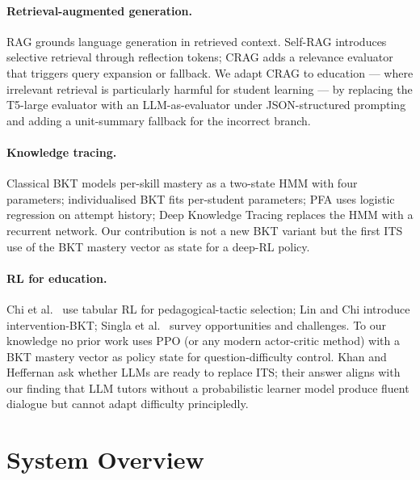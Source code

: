 \documentclass[conference]{IEEEtran}
\begin{document}
\paragraph{Retrieval-augmented generation.}
RAG \cite{lewis2020rag} grounds language generation in retrieved
context. Self-RAG \cite{asai2024selfrag} introduces selective
retrieval through reflection tokens; CRAG \cite{yan2024crag} adds a
relevance evaluator that triggers query expansion or fallback. We
adapt CRAG to education --- where irrelevant retrieval is particularly
harmful for student learning --- by replacing the T5-large evaluator
with an LLM-as-evaluator under JSON-structured prompting and adding
a unit-summary fallback for the incorrect branch.

\paragraph{Knowledge tracing.}
Classical BKT \cite{corbett1994bkt} models per-skill mastery as a
two-state HMM with four parameters; individualised BKT
\cite{yudelson2013ibkt} fits per-student parameters; PFA
\cite{pavlik2009pfa} uses logistic regression on attempt history;
Deep Knowledge Tracing \cite{piech2015dkt} replaces the HMM with a
recurrent network. Our contribution is not a new BKT variant but the
first ITS use of the BKT mastery vector as state for a deep-RL policy.

\paragraph{RL for education.}
Chi et al.~\cite{chi2011rl} use tabular RL for pedagogical-tactic
selection; Lin and Chi \cite{linchi2016ibkt} introduce
intervention-BKT; Singla et al.~\cite{singla2021rl4ed} survey
opportunities and challenges. To our knowledge no prior work uses PPO
\cite{schulman2017ppo} (or any modern actor-critic method) with a BKT
mastery vector as policy state for question-difficulty control. Khan
and Heffernan \cite{khan2023llmtutor} ask whether LLMs are ready to
replace ITS; their answer aligns with our finding that LLM tutors
without a probabilistic learner model produce fluent dialogue but
cannot adapt difficulty principledly.

\section{System Overview}\label{sec:overview}
\end{document}
